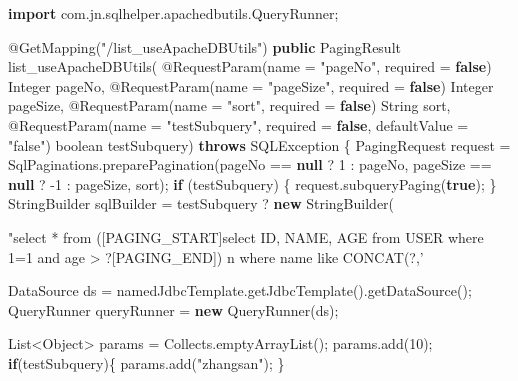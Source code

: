 \documentclass[
]{book}
\newenvironment{Shaded}{\begin{snugshade}}{\end{snugshade}}
\newcommand{\AttributeTok}[1]{\textcolor[rgb]{0.77,0.63,0.00}{#1}}
\newcommand{\BuiltInTok}[1]{#1}
\newcommand{\DataTypeTok}[1]{\textcolor[rgb]{0.13,0.29,0.53}{#1}}
\newcommand{\DecValTok}[1]{\textcolor[rgb]{0.00,0.00,0.81}{#1}}
\newcommand{\FunctionTok}[1]{\textcolor[rgb]{0.00,0.00,0.00}{#1}}
\newcommand{\ImportTok}[1]{#1}
\newcommand{\KeywordTok}[1]{\textcolor[rgb]{0.13,0.29,0.53}{\textbf{#1}}}
\newcommand{\NormalTok}[1]{#1}
\newcommand{\StringTok}[1]{\textcolor[rgb]{0.31,0.60,0.02}{#1}}
\begin{document}
\begin{Shaded}
\begin{Highlighting}[]
    
    \KeywordTok{import}\ImportTok{ com.jn.sqlhelper.apachedbutils.QueryRunner;}
    
    \AttributeTok{@GetMapping}\NormalTok{(}\StringTok{"/list_useApacheDBUtils"}\NormalTok{)}
    \KeywordTok{public}\NormalTok{ PagingResult }\FunctionTok{list_useApacheDBUtils}\NormalTok{(}
            \AttributeTok{@RequestParam}\NormalTok{(name = }\StringTok{"pageNo"}\NormalTok{, required = }\KeywordTok{false}\NormalTok{) }\BuiltInTok{Integer}\NormalTok{ pageNo,}
            \AttributeTok{@RequestParam}\NormalTok{(name = }\StringTok{"pageSize"}\NormalTok{, required = }\KeywordTok{false}\NormalTok{) }\BuiltInTok{Integer}\NormalTok{ pageSize,}
            \AttributeTok{@RequestParam}\NormalTok{(name = }\StringTok{"sort"}\NormalTok{, required = }\KeywordTok{false}\NormalTok{) }\BuiltInTok{String}\NormalTok{ sort,}
            \AttributeTok{@RequestParam}\NormalTok{(name = }\StringTok{"testSubquery"}\NormalTok{, required = }\KeywordTok{false}\NormalTok{, defaultValue = }\StringTok{"false"}\NormalTok{) }\DataTypeTok{boolean}\NormalTok{ testSubquery) }\KeywordTok{throws} \BuiltInTok{SQLException}\NormalTok{ \{}
\NormalTok{        PagingRequest request = SqlPaginations.}\FunctionTok{preparePagination}\NormalTok{(pageNo == }\KeywordTok{null}\NormalTok{ ? }\DecValTok{1}\NormalTok{ : pageNo, pageSize == }\KeywordTok{null}\NormalTok{ ? -}\DecValTok{1}\NormalTok{ : pageSize, sort);}
        \KeywordTok{if}\NormalTok{ (testSubquery) \{}
\NormalTok{            request.}\FunctionTok{subqueryPaging}\NormalTok{(}\KeywordTok{true}\NormalTok{);}
\NormalTok{        \}}
        \BuiltInTok{StringBuilder}\NormalTok{ sqlBuilder = testSubquery ? }\KeywordTok{new} \BuiltInTok{StringBuilder}\NormalTok{(}\StringTok{"select * from ([PAGING_START]select ID, NAME, AGE from USER where 1=1 and age > ?[PAGING_END]) n where name like CONCAT(?,'%') "}\NormalTok{) : }\KeywordTok{new} \BuiltInTok{StringBuilder}\NormalTok{(}\StringTok{"select ID, NAME, AGE from USER where 1=1 and age > ?"}\NormalTok{);}

        \BuiltInTok{DataSource}\NormalTok{ ds = namedJdbcTemplate.}\FunctionTok{getJdbcTemplate}\NormalTok{().}\FunctionTok{getDataSource}\NormalTok{();}
\NormalTok{        QueryRunner queryRunner = }\KeywordTok{new} \FunctionTok{QueryRunner}\NormalTok{(ds);}

        \BuiltInTok{List}\NormalTok{<}\BuiltInTok{Object}\NormalTok{> params = Collects.}\FunctionTok{emptyArrayList}\NormalTok{();}
\NormalTok{        params.}\FunctionTok{add}\NormalTok{(}\DecValTok{10}\NormalTok{);}
        \KeywordTok{if}\NormalTok{(testSubquery)\{}
\NormalTok{            params.}\FunctionTok{add}\NormalTok{(}\StringTok{"zhangsan"}\NormalTok{);}
\NormalTok{        \}}

}
\end{Highlighting}
\end{Shaded}
\end{document}
